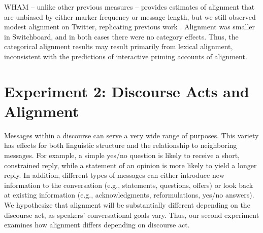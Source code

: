 \documentclass[11pt]{article}
\begin{document}
WHAM -- unlike other previous measures -- provides estimates of alignment that are unbiased by either marker frequency or message length, but we still observed modest alignment on Twitter, replicating previous work \cite{DoyleYurovskyFrank2016,DNMGamonDumais2011}. Alignment was smaller in Switchboard, and in both cases there were no category effects. Thus, the categorical alignment results may result primarily from lexical alignment, inconsistent with the predictions of interactive priming accounts of alignment.



\section{Experiment 2: Discourse Acts and Alignment}

Messages within a discourse can serve a very wide range of purposes. This variety has effects for both linguistic structure and the relationship to neighboring messages. For example, a simple yes/no question is likely to receive a short, constrained reply, while a statement of an opinion is more likely to yield a longer reply. In addition, different types of messages can either introduce new information to the conversation (e.g., statements, questions, offers) or look back at existing information (e.g., acknowledgments, reformulations, yes/no answers). We hypothesize that alignment will be substantially different depending on the discourse act, as speakers' conversational goals vary. Thus, our second experiment examines how alignment differs depending on discourse act.
\end{document}
